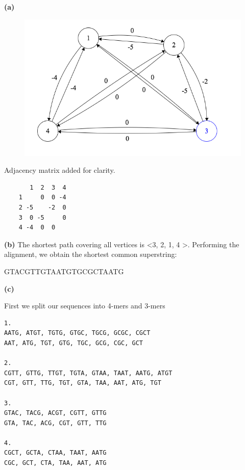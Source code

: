 \documentclass[11pt,letterpaper]{article}
\renewcommand{\part}[1] {\vspace{.10in} {\bf (#1)}}
\begin{document}
\part{a}
\begin{figure}[p]
    \includegraphics{3a.png}
\end{figure}

Adjacency matrix added for clarity.
\begin{verbatim}
       1  2  3  4
    1     0  0 -4
    2 -5    -2  0
    3  0 -5     0
    4 -4  0  0   
\end{verbatim}

\part{b}
The shortest path covering all vertices is \textless 3, 2, 1, 4 \textgreater.
Performing the alignment, we obtain the shortest common superstring:

    GTACGTTGTAATGTGCGCTAATG

\part{c}

First we split our sequences into 4-mers and 3-mers

\begin{verbatim}
1.
AATG, ATGT, TGTG, GTGC, TGCG, GCGC, CGCT
AAT, ATG, TGT, GTG, TGC, GCG, CGC, GCT

2.
CGTT, GTTG, TTGT, TGTA, GTAA, TAAT, AATG, ATGT
CGT, GTT, TTG, TGT, GTA, TAA, AAT, ATG, TGT

3.
GTAC, TACG, ACGT, CGTT, GTTG
GTA, TAC, ACG, CGT, GTT, TTG

4.
CGCT, GCTA, CTAA, TAAT, AATG
CGC, GCT, CTA, TAA, AAT, ATG
\end{verbatim}
\end{document}
